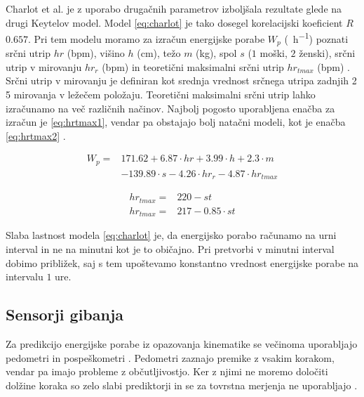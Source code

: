 Charlot et al. \cite{charlot2014improvement} je z uporabo drugačnih parametrov izboljšala rezultate glede na drugi Keytelov model. Model \eqref{eq:charlot} je tako dosegel korelacijski koeficient $R$ $0.657$. Pri tem modelu moramo za izračun energijske porabe $W_p$ (\si{\kcal.\hour^{-1}})  poznati srčni utrip $hr$ (\si{bpm}), višino $h$ (\si{\cm}), težo $m$ (\si{\kg}), spol $s$ ($1$ moški, $2$ ženski), srčni utrip v mirovanju $hr_r$ (\si{bpm}) in teoretični maksimalni srčni utrip $hr_{tmax}$ (\si{bpm}) \cite{charlot2014improvement}. Srčni utrip v mirovanju je definiran kot srednja vrednost srčnega utripa zadnjih \SI{2}{\min} \SI{5}{\min} mirovanja v ležečem položaju. Teoretični maksimalni srčni utrip lahko izračunamo na več različnih načinov. Najbolj pogosto uporabljena enačba za izračun je \eqref{eq:hrtmax1}, vendar pa obstajajo bolj natačni modeli, kot je enačba \eqref{eq:hrtmax2} \cite{miller1993predicting}. 

\begin{align}\label{eq:charlot}
W_p = & 171.62 + 6.87 \cdot hr + 3.99 \cdot h + 2.3 \cdot m \nonumber \\
& - 139.89 \cdot s - 4.26 \cdot hr_r - 4.87 \cdot hr_{tmax}
\end{align}

\begin{align}
	hr_{tmax} = & 220 - st \label{eq:hrtmax1}\\ 
    hr_{tmax} = & 217 - 0.85 \cdot st \label{eq:hrtmax2}
\end{align}

Slaba lastnost modela \eqref{eq:charlot} je, da energijsko porabo računamo na urni interval in ne na minutni kot je to običajno. Pri pretvorbi v minutni interval dobimo približek, saj s tem upoštevamo konstantno vrednost energijske porabe na intervalu $1$ ure. 

\subsection{Sensorji gibanja}
Za predikcijo energijske porabe iz opazovanja kinematike se večinoma uporabljajo pedometri in pospeškometri \cite{levine2005measurement}. Pedometri zaznajo premike z vsakim korakom, vendar pa imajo probleme z občutljivostjo. Ker  z njimi ne moremo določiti dolžine koraka so zelo slabi prediktorji in se za tovrstna merjenja ne uporabljajo \cite{levine2005measurement}.

